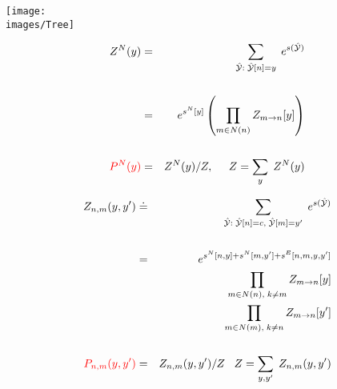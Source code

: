 {\centerline{\texttt{[image: \\images/Tree]}}

\begin{eqnarray*}
Z^N(y) & = & \sum_{\hat{\cal Y}:\; \hat{\cal Y}[n] = y} \;e^{s(\hat{\cal Y})} \\
\\
& = & e^{s^N[y]} \left(\prod_{m\in N(n)} Z_{m \rightarrow n}[y]\right) \\
\\
{\color{red} P^N(y)} & = & Z^N(y)/Z,\;\;\;\;\; Z = \sum_{y}\;Z^N(y)
\end{eqnarray*}



\begin{eqnarray*}
Z_{n,m}(y,y') & \doteq & \sum_{\hat{\cal Y}:\; \hat{\cal Y}[n] = c,\;\hat{\cal Y}[m] = y'} \;e^{s(\hat{\cal Y})} \\
\\
& = & e^{s^N[n,y] + s^N[m,y'] +s^E[n,m,y,y']} \\
& & \prod_{m\in N(n),\;k \not = m} Z_{m \rightarrow n}[y] \\
& & \prod_{m\in N(m),\;k \not = n} Z_{m \rightarrow n}[y'] \\
\\
{\color{red} P_{n,m}(y,y')} & = & Z_{n,m}(y,y')/Z\;\;\;Z = \sum_{y,y'}\;Z_{n,m}(y,y')
\end{eqnarray*}


}


